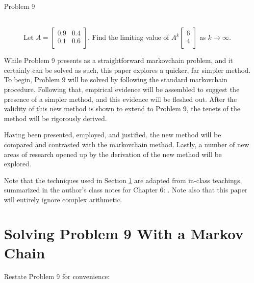 \documentclass[titlepage]{article}
\begin{document}
\begin{prob}
    \begin{description}
        \item[Problem 9] \hfill \\ Let $
            A =
            \begin{bmatrix}
                0.9 & 0.4\\
                0.1 & 0.6\\
            \end{bmatrix}
        $. Find the limiting value of $
            A^k
            \begin{bmatrix}
                6\\
                4\\
            \end{bmatrix}
        $ as $k\to\infty$.
    \end{description}
\end{prob}

While Problem 9 presents as a straightforward \Gls{markovchain} problem, and it certainly can be solved as such, this paper explores a quicker, far simpler method. To begin, Problem 9 will be solved by following the standard \Gls{markovchain} procedure. Following that, empirical evidence will be assembled to suggest the presence of a simpler method, and this evidence will be fleshed out. After the validity of this new method is shown to extend to Problem 9, the tenets of the method will be rigorously derived.\par
Having been presented, employed, and justified, the new method will be compared and contrasted with the \Gls{markovchain} method. Lastly, a number of new areas of research opened up by the derivation of the new method will be explored.\par
Note that the techniques used in Section \ref{sse:markovchain} are adapted from in-class teachings, summarized in the author's class notes for Chapter 6: \cite{bib:ch6notes}. Note also that this paper will entirely ignore complex arithmetic.
\newpage



\section{Solving Problem 9 With a Markov Chain}\label{sse:markovchain}
Restate Problem 9 for convenience:
\end{document}
